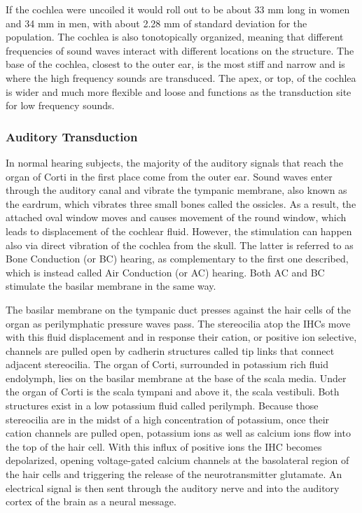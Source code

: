 If the cochlea were uncoiled it would roll out to be about 33 mm long in
women and 34 mm in men, with about 2.28 mm of standard deviation for the
population. The cochlea is also tonotopically organized, meaning that
different frequencies of sound waves interact with different locations
on the structure. The base of the cochlea, closest to the outer ear, is
the most stiff and narrow and is where the high frequency sounds are
transduced. The apex, or top, of the cochlea is wider and much more
flexible and loose and functions as the transduction site for low
frequency sounds.

\hypertarget{auditory-transduction}{%
\subsubsection{Auditory Transduction}\label{auditory-transduction}}

In normal hearing subjects, the majority of the auditory signals that
reach the organ of Corti in the first place come from the outer ear.
Sound waves enter through the auditory canal and vibrate the tympanic
membrane, also known as the eardrum, which vibrates three small bones
called the ossicles. As a result, the attached oval window moves and
causes movement of the round window, which leads to displacement of the
cochlear fluid. However, the stimulation can happen also via direct
vibration of the cochlea from the skull. The latter is referred to as
Bone Conduction (or BC) hearing, as complementary to the first one
described, which is instead called Air Conduction (or AC) hearing. Both
AC and BC stimulate the basilar membrane in the same way.

The basilar membrane on the tympanic duct presses against the hair cells
of the organ as perilymphatic pressure waves pass. The stereocilia atop
the IHCs move with this fluid displacement and in response their cation,
or positive ion selective, channels are pulled open by cadherin
structures called tip links that connect adjacent stereocilia. The organ
of Corti, surrounded in potassium rich fluid endolymph, lies on the
basilar membrane at the base of the scala media. Under the organ of
Corti is the scala tympani and above it, the scala vestibuli. Both
structures exist in a low potassium fluid called perilymph. Because
those stereocilia are in the midst of a high concentration of potassium,
once their cation channels are pulled open, potassium ions as well as
calcium ions flow into the top of the hair cell. With this influx of
positive ions the IHC becomes depolarized, opening voltage-gated calcium
channels at the basolateral region of the hair cells and triggering the
release of the neurotransmitter glutamate. An electrical signal is then
sent through the auditory nerve and into the auditory cortex of the
brain as a neural message.

